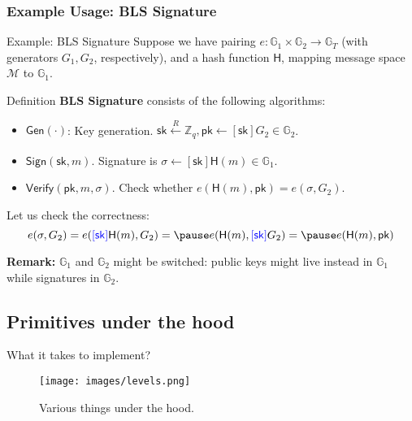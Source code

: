 \documentclass[xcolor={usenames,dvipsnames}]{beamer}
\begin{document}
    \subsubsection{Example Usage: BLS Signature}
    \begin{frame}{Example: BLS Signature}
        Suppose we have pairing $e: \mathbb{G}_1 \times \mathbb{G}_2 \to \mathbb{G}_T$ (with generators $G_1,G_2$, respectively), and a hash function $\mathsf{H}$, mapping message space $\mathcal{M}$ to $\mathbb{G}_1$.
        \pause
        \begin{block}{Definition}
            \textbf{BLS Signature} consists of the following algorithms:
            \begin{itemize}
                \item $\mathsf{Gen}(\cdot)$: Key generation. $\mathsf{sk} \xleftarrow[]{R} \mathbb{Z}_q, \mathsf{pk} \gets [\mathsf{sk}] G_2 \in \mathbb{G}_2$.\pause
                \item $\mathsf{Sign}(\mathsf{sk},m)$. Signature is $\sigma \gets [\mathsf{sk}] \mathsf{H}(m) \in \mathbb{G}_1$.\pause
                \item $\mathsf{Verify}(\mathsf{pk},m,\sigma)$. Check whether $e(\mathsf{H}(m), \mathsf{pk}) = e(\sigma, G_2)$. \pause
            \end{itemize}
        \end{block}
        
        Let us check the correctness:
        \begin{equation*}
            e(\sigma,G_2) = e(\textcolor{blue}{[\mathsf{sk}]}\mathsf{H}(m),G_2) =\pause e(\mathsf{H}(m), \textcolor{blue}{[\mathsf{sk}]}G_2) =\pause e(\mathsf{H}(m), \mathsf{pk})
        \end{equation*}
        
        \pause\textbf{Remark:} $\mathbb{G}_1$ and $\mathbb{G}_2$ might be switched: public keys might live instead in $\mathbb{G}_1$ while signatures in $\mathbb{G}_2$.
    \end{frame}

    \subsection{Primitives under the hood}
    \begin{frame}{What it takes to implement?}
        \begin{figure}
            \centering
            \texttt{[image: images/levels.png]}
            \caption{Various things under the hood.}
        \end{figure}
    \end{frame}
\end{document}
